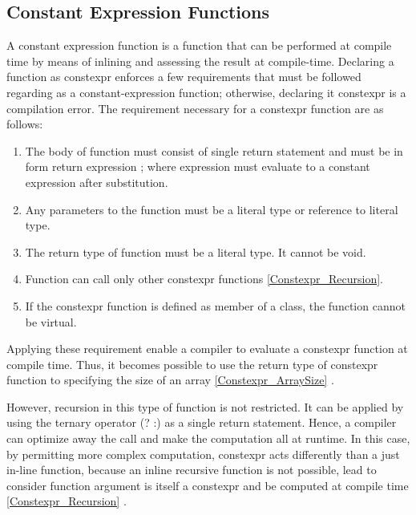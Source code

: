 \documentclass[11pt]{report}
\begin{document}
\subsection{Constant Expression Functions}
\label{Constant Expression Functions}
A constant expression function is a function that can be performed at compile time by means of inlining and assessing the result at compile-time. Declaring a function as constexpr enforces a few requirements that must be followed regarding as a constant-expression function; otherwise, declaring it constexpr is a compilation error.  The requirement necessary for a constexpr function are as follows:

\begin{enumerate}
\item The body of function must consist of single return statement and must be in form {return expression ;} where expression must evaluate to a constant expression after substitution.

\item Any parameters to the function must be a literal type or reference to literal type.

\item The return type of function must be a literal type. It cannot be void.

\item Function can call only other constexpr functions \ref{Constexpr_Recursion}.

\item If the constexpr function is defined as member of a class, the function cannot be virtual.
\end{enumerate}

Applying these requirement enable a compiler to evaluate a constexpr function at compile time. Thus, it becomes possible to use the return type of constexpr function to specifying the size of an array \ref{Constexpr_ArraySize} \cite{Gregorie:professionalcpp}.

However, recursion in this type of function is not restricted. It can be applied by using the ternary operator (? :) as a single return statement. Hence, a compiler can optimize away the call and make the computation all at runtime. In this case, by permitting more complex computation, constexpr acts differently than a just in-line function, because an inline recursive function is not possible, lead to consider function argument is itself a constexpr and be computed at compile time \ref{Constexpr_Recursion} \cite{Allain:2011:FutureCpp}.
\end{document}
